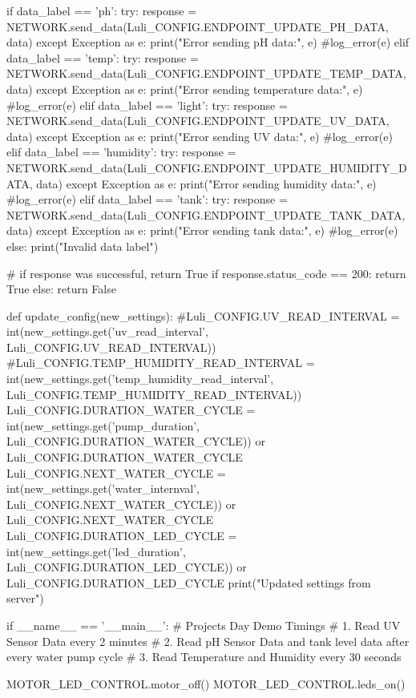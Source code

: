 \documentclass[12pt]{article} %
\begin{document}
\begin{pythoncode}[caption={Main MicroPython Code}]
    if data_label == 'ph':
        try:
            response = NETWORK.send_data(Luli_CONFIG.ENDPOINT_UPDATE_PH_DATA, data)
        except Exception as e:
            print("Error sending pH data:", e)
            #log_error(e)
    elif data_label == 'temp':
        try:
            response = NETWORK.send_data(Luli_CONFIG.ENDPOINT_UPDATE_TEMP_DATA, data)
        except Exception as e:
            print("Error sending temperature data:", e)
            #log_error(e)
    elif data_label == 'light':
        try:
            response = NETWORK.send_data(Luli_CONFIG.ENDPOINT_UPDATE_UV_DATA, data)
        except Exception as e:
            print("Error sending UV data:", e)
            #log_error(e)
    elif data_label == 'humidity':
        try:
            response = NETWORK.send_data(Luli_CONFIG.ENDPOINT_UPDATE_HUMIDITY_DATA, data)
        except Exception as e:
            print("Error sending humidity data:", e)
            #log_error(e)
    elif data_label == 'tank':
        try:
            response = NETWORK.send_data(Luli_CONFIG.ENDPOINT_UPDATE_TANK_DATA, data)
        except Exception as e:
            print("Error sending tank data:", e)
            #log_error(e)
    else:
        print("Invalid data label")

    # if response was successful, return True
    if response.status_code == 200:
        return True
    else:
        return False

def update_config(new_settings):
    #Luli_CONFIG.UV_READ_INTERVAL = int(new_settings.get('uv_read_interval', Luli_CONFIG.UV_READ_INTERVAL))
    #Luli_CONFIG.TEMP_HUMIDITY_READ_INTERVAL = int(new_settings.get('temp_humidity_read_interval', Luli_CONFIG.TEMP_HUMIDITY_READ_INTERVAL))
    Luli_CONFIG.DURATION_WATER_CYCLE = int(new_settings.get('pump_duration', Luli_CONFIG.DURATION_WATER_CYCLE)) or Luli_CONFIG.DURATION_WATER_CYCLE
    Luli_CONFIG.NEXT_WATER_CYCLE = int(new_settings.get('water_internval', Luli_CONFIG.NEXT_WATER_CYCLE)) or Luli_CONFIG.NEXT_WATER_CYCLE
    Luli_CONFIG.DURATION_LED_CYCLE = int(new_settings.get('led_duration', Luli_CONFIG.DURATION_LED_CYCLE)) or Luli_CONFIG.DURATION_LED_CYCLE
    print("Updated settings from server")


if __name__ == '__main__':
    # Projects Day Demo Timings
    # 1. Read UV Sensor Data every 2 minutes
    # 2. Read pH Sensor Data and tank level data after every water pump cycle
    # 3. Read Temperature and Humidity every 30 seconds


    MOTOR_LED_CONTROL.motor_off()
    MOTOR_LED_CONTROL.leds_on()


\end{pythoncode}
\end{document}
